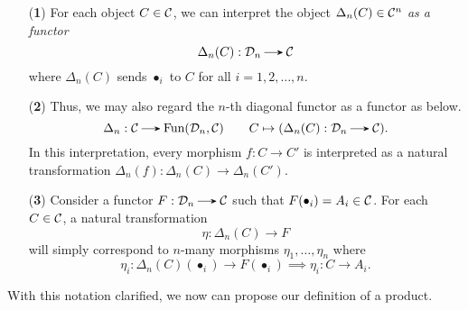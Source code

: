 \begin{definition}
    \begin{itemize}
        \item[(\textbf{1})] For each object $C \in \mathcal{C}$, 
        we can interpret the object $\Delta_n(C) \in \mathcal{C}^n$ 
        \emph{as a functor}
        \[
            \Delta_n(C): \mathcal{D}_n \to \cc
        \]
        where $\Delta_n(C)$ sends $\bullet_i$ to  $C$ for all $i= 1, 2, \dots, n$.

        \item[(\textbf{2})] Thus, we may also regard the $n$-th diagonal functor as a functor as below.
        \[
            \Delta_n: \cc \to \text{Fun}(\mathcal{D}_n, \cc) \qquad C \mapsto (\Delta_n(C) :\mathcal{D}_n \to \cc).
        \]
        In this interpretation, every morphism $f:C \to C'$ is interpreted as a natural 
        transformation $\Delta_n(f): \Delta_n(C) \to \Delta_n(C')$. 

        \item[(\textbf{3})] Consider a functor $F: \dd_n \to \cc$ such that $F(\bullet_i) = A_i \in \mathcal{C}$. 
        For each $C \in \mathcal{C}$, a natural transformation 
        \[
            \eta: \Delta_n(C) \to F
        \]
        will simply correspond to $n$-many morphisms $\eta_1, \dots, 
        \eta_n$ where
        \[
            \eta_i: \Delta_n(C)(\bullet_i) \to  F(\bullet_i) 
            \implies 
            \eta_i: C \to A_i.
        \]
    \end{itemize}
    \end{definition}
    With this notation clarified, we now can propose  our  definition of a  product. 

